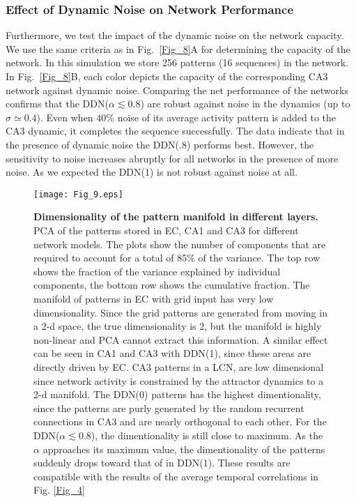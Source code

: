 \documentclass[utf8]{frontiersSCNS} %
\begin{document}
\subsubsection{Effect of Dynamic Noise on Network Performance}
Furthermore, we test the impact of the dynamic noise on the network capacity. We use the same criteria as in Fig.~\ref{Fig_8}A for determining the capacity of the network. In this simulation we store 256 patterns (16 sequences) in the network. 
%
In Fig.~\ref{Fig_8}B, each color depicts the capacity of the corresponding CA3 network against dynamic noise.
%  
Comparing the net performance of the networks confirms that the DDN($\alpha \lesssim 0.8$) are robust against noise in the dynamics (up to $\sigma \simeq 0.4$). 
%
Even when $ 40 \% $ noise of its average activity pattern is added to the CA3 dynamic, it completes the sequence successfully. 
%
The data indicate that in the presence of dynamic noise the DDN(.8) performs best. 
%
However, the sensitivity to noise increases abruptly for all networks in the presence of more noise.
%
As we expected the DDN(1) is not robust against noise at all.
\begin{figure}[!htb]
\centering\texttt{[image: Fig\_9.eps]}
\caption{\textbf{Dimensionality of the pattern manifold in different layers.} PCA of the patterns stored in EC, CA1 and CA3 for different network models. The plots show the number of components that are required to account for a total of $85 \%$ of the variance. The top row shows the fraction of the variance explained by individual components, the bottom row shows the cumulative fraction. The manifold of patterns in EC with grid input has very low dimensionality. Since the grid patterns are generated from moving in a 2-d space, the true dimensionality is 2, but the manifold is highly non-linear and PCA cannot extract this information. A similar effect can be seen in CA1 and CA3 with DDN(1), since these areas are directly driven by EC. CA3 patterns in a LCN, are low dimensional since network activity is constrained by the attractor dynamics to a 2-d manifold. The DDN(0) patterns has the highest dimentionality, since the patterns are purly generated by the random recurrent connections in CA3 and are nearly orthogonal to each other. For the DDN($\alpha \lesssim 0.8$), the dimentionality is still close to maximum. As the $\alpha$ approaches its maximum value, the dimentionality of the patterns suddenly drops toward that of in DDN(1). These results are compatible with the results of the average temporal correlations in Fig.\: \ref{Fig_4} }
\label{Fig_9}
\end{figure}
\end{document}
